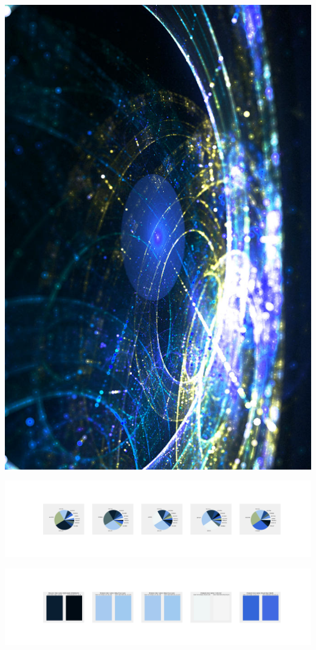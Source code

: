 \documentclass[11pt]{article}
\begin{document}
\begin{landscape}
    \begin{center}
    \includegraphics[width=\textwidth]{./nbimg/file (98).jpg}
    \end{center}

    \begin{center}
    \includegraphics[width=250mm]{./nbimg/pie-449.jpg}
    \end{center}

    \begin{center}
    \includegraphics[width=250mm]{./nbimg/peak-449.jpg}
    \end{center}
    


\end{landscape}
\end{document}
